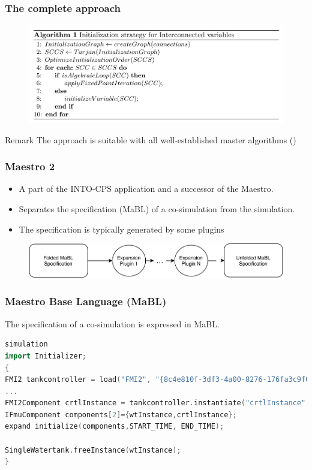 \documentclass{beamer}
\begin{document}
\begin{frame}[fragile]
\frametitle{The complete approach}
\begin{figure}
    \centering
    \includegraphics[scale=0.25]{images/Screenshot 2020-09-09 at 09.12.56.png}
\end{figure}

\begin{block}{Remark} 
    The approach is suitable with all well-established master algorithms ()
\end{block}
\end{frame}


\begin{frame}
\frametitle{Maestro 2}
\begin{itemize}
    \item A part of the INTO-CPS application and a successor of the Maestro.    
    \item Separates the specification (MaBL) of a co-simulation from the simulation.
    \item The specification is typically generated by some plugins
\end{itemize}
\begin{figure}
    \centering
    \includegraphics[scale=0.6]{images/ExpansionPlugin-Page-1.pdf}
    \label{fig:my_label}
\end{figure}
\end{frame}


\begin{frame}[fragile]
\frametitle{Maestro Base Language (MaBL)}
The specification of a co-simulation is expressed in MaBL.

\begin{lstlisting}[language=C++]
simulation
import Initializer;
{
FMI2 tankcontroller = load("FMI2", "{8c4e810f-3df3-4a00-8276-176fa3c9f000}", "src/test/resources/watertankcontroller-c.fmu");
...
FMI2Component crtlInstance = tankcontroller.instantiate("crtlInstance", false, false);;
IFmuComponent components[2]={wtInstance,crtlInstance};
expand initialize(components,START_TIME, END_TIME);

SingleWatertank.freeInstance(wtInstance);
}
\end{lstlisting}
\end{frame}
\end{document}
